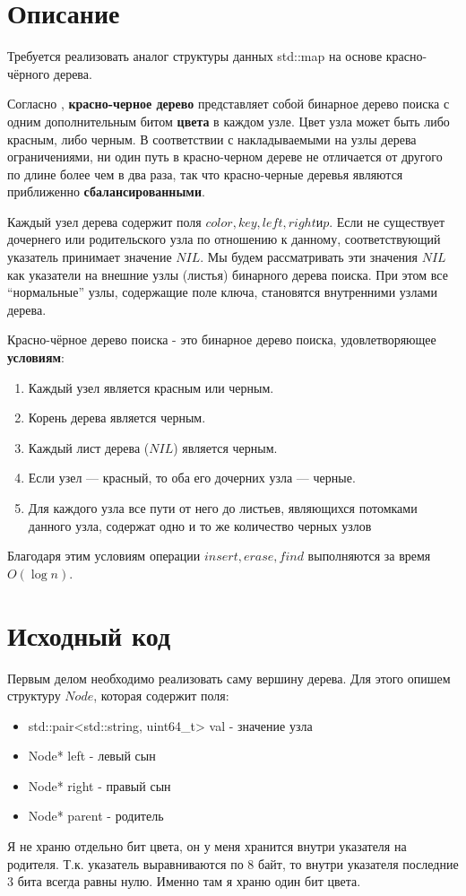\section{Описание}

Требуется реализовать аналог структуры данных std::map на основе красно-чёрного дерева.

Согласно \cite{Kormen}, \textbf{красно-черное дерево} представляет собой бинарное дерево поиска с одним дополнительным битом \textbf{цвета} в каждом узле. Цвет узла может быть либо красным,
либо черным. В соответствии с накладываемыми на узлы дерева ограничениями,
ни один путь в красно-черном дереве не отличается от другого по длине более
чем в два раза, так что красно-черные деревья являются приближенно \textbf{сбалансированными}.

Каждый узел дерева содержит поля $color , key, left, right и p$. Если не существует дочернего или родительского узла по отношению к данному, соответствующий
указатель принимает значение $NIL$. Мы будем рассматривать эти значения $NIL$ как
указатели на внешние узлы (листья) бинарного дерева поиска. При этом все “нормальные” узлы, содержащие поле ключа, становятся внутренними узлами дерева.

Красно-чёрное дерево поиска - это бинарное дерево поиска, удовлетворяющее \textbf{условиям}:
\begin{enumerate} 
  \item Каждый узел является красным или черным.
  \item  Корень дерева является черным.
  \item  Каждый лист дерева ($NIL$) является черным.
  \item  Если узел — красный, то оба его дочерних узла — черные.
  \item  Для каждого узла все пути от него до листьев, являющихся потомками
данного узла, содержат одно и то же количество черных узлов
\end{enumerate}

Благодаря этим условиям операции $insert, erase, find$ выполняются за время $O(\log{}n)$.


\pagebreak

\section{Исходный код}

Первым делом необходимо реализовать саму вершину дерева. Для этого опишем структуру $Node$, которая содержит поля:
\begin{itemize}
  \item std::pair<std::string, uint64\_t> val - значение узла
  \item Node* left - левый сын
  \item Node* right - правый сын
  \item Node* parent - родитель
\end{itemize}
Я не храню отдельно бит цвета, он у меня хранится внутри указателя на родителя. Т.к. указатель выравниваются по 8 байт, то внутри указателя последние 3 бита всегда равны нулю. Именно там я храню один бит цвета.

